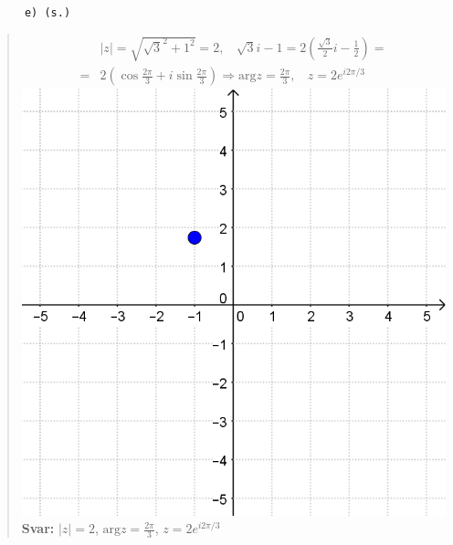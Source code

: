 \documentclass[a4paper]{article}
\newcommand{\tskcol}[1]{\textcolor{tskcol}{#1}}
\begin{document}
	\texttt{\tskcol{~~~~~~e) (s.)}}
	\begin{quotation}
		\noindent
		\begin{align*}
		&|z|=\sqrt{\sqrt{3}^2+1^2}=2,~~~~ \sqrt{3}i-1=2(\frac{\sqrt{3}}{2}i-\frac{1}{2})= \\ =
		&2(\cos\frac{2\pi}{3}+i\sin\frac{2\pi}{3}) \Rightarrow \text{arg}z=\frac{2\pi}{3},~~~~ z=2e^{i2\pi/3}
		\end{align*}
		\includegraphics[scale=0.2]{images/619e.PNG}
		\\
		\textbf{Svar:} $|z|=2$, $\text{arg}z=\frac{2\pi}{3}$, $z=2e^{i2\pi/3}$
	\end{quotation}
	
\end{document}
